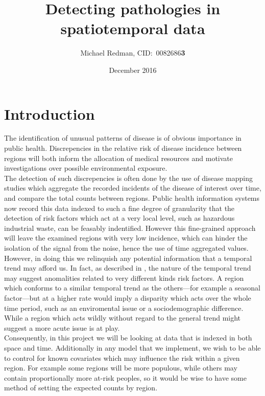 \documentclass[11pt]{report}
\begin{document}
\title{Detecting pathologies in spatiotemporal data}
\author{Michael Redman, CID:\ 0082686\textbf{3}}
\date{December 2016}

\maketitle

\tableofcontents

\chapter{Introduction}

The identification of unusual patterns of disease is of obvious importance in public health. Discrepencies in the relative risk of disease incidence between regions will both inform the allocation of medical resources and motivate investigations over possible environmental exposure. \\

 The detection of such discrepencies is often done by the use of disease mapping studies which aggregate the recorded incidents of the disease of interest over time, and compare the total counts between regions. Public health information systems now record this data indexed to such a fine degree of granularity that the detection of risk factors which act at a very local level, such as hazardous industrial waste, can be feasably indentified. However this fine-grained approach will leave the examined regions with very low incidence, which can hinder the isolation of the signal from the noise, hence the use of time aggregated values. However, in doing this we relinquish any potential information that a temporal trend may afford us. In fact, as described in \citet{stability}, the nature of the temporal trend may suggest anomalities related to very different kinds risk factors. A region which conforms to a similar temporal trend as the others---for example a seasonal factor---but at a higher rate would imply a disparity which acts over the whole time period, such as an enviromental issue or a sociodemographic difference. While a region which acts wildly without regard to the general trend might suggest a more acute issue is at play. \\

Consequently, in this project we will be looking at data that is indexed in both space and time. Additionally in any model that we implement, we wish to be able to control for known covariates which may influence the risk within a given region. For example some regions will be more populous, while others may contain proportionally more at-risk peoples, so it would be wise to have some method of setting the expected counts by region. \\
\end{document}
